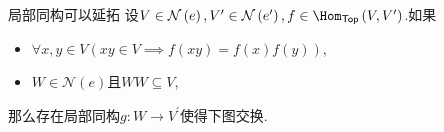 \begin{proposition}{局部同构可以延拓}{}
	设$V\in\mathcal{N}\left(e\right),V^{\prime}\in\mathcal{N}\left(e^{\prime}\right),f\in\Hom_{\mathsf{Top}}\left(V,V^{\prime}\right)$.如果
	\begin{itemize}
		\item $\forall x,y\in V\left(xy\in V\implies f\left(xy\right)=f\left(x\right)f\left(y\right)\right)$,
		\item $W\in\mathcal{N}\left(e\right)$且$WW\subseteq V$,
	\end{itemize}
	那么存在局部同构$g:W\to V^{\prime}$使得下图交换.
	\begin{center}
	\end{center}
\end{proposition}





















































